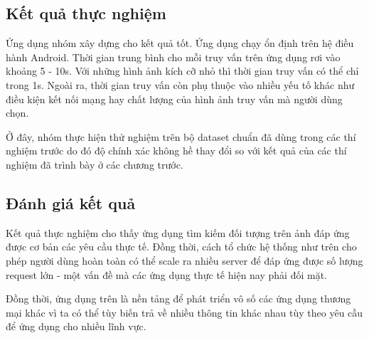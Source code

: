 	
	\subsection{Kết quả thực nghiệm}
	Ứng dụng nhóm xây dựng cho kết quả tốt. Ứng dụng chạy ổn định trên hệ điều hành Android. Thời gian trung bình cho mỗi truy vấn trên ứng dụng rơi vào khoảng 5 - 10s. Với những hình ảnh kích cỡ nhỏ thì thời gian truy vấn có thể chỉ trong 1s. Ngoài ra, thời gian truy vấn còn phụ thuộc vào nhiều yếu tố khác như điều kiện kết nối mạng hay chất lượng của hình ảnh truy vấn mà người dùng chọn.
	
	Ở đây, nhóm thực hiện thử nghiệm trên bộ dataset chuẩn đã dùng trong các thí nghiệm trước do đó độ chính xác không hề thay đổi so với kết quả của các thí nghiệm đã trình bày ở các chương trước.
	
	\subsection{Đánh giá kết quả}
	Kết quả thực nghiệm cho thấy ứng dụng tìm kiếm đối tượng trên ảnh đáp ứng được cơ bản các yêu cầu thực tế. Đồng thời, cách tổ chức hệ thống như trên cho phép người dùng hoàn toàn có thể scale ra nhiều server để đáp ứng được số lượng request lớn - một vấn đề mà các ứng dụng thực tế hiện nay phải đối mặt.
	
	Đồng thời, ứng dụng trên là nền tảng để phát triển vô số các ứng dụng thương mại khác vì ta có thể tùy biến trả về nhiều thông tin khác nhau tùy theo yêu cầu để ứng dụng cho nhiều lĩnh vực.